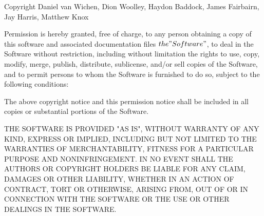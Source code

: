 
Copyright  Daniel van Wichen, Dion Woolley, Haydon Baddock, James Fairbairn, Jay Harris, Matthew Knox

Permission is hereby granted, free of charge, to any person obtaining a copy
of this software and associated documentation files \(the "Software"\), to deal
in the Software without restriction, including without limitation the rights
to use, copy, modify, merge, publish, distribute, sublicense, and/or sell
copies of the Software, and to permit persons to whom the Software is
furnished to do so, subject to the following conditions:

The above copyright notice and this permission notice shall be included in
all copies or substantial portions of the Software.

THE SOFTWARE IS PROVIDED "AS IS", WITHOUT WARRANTY OF ANY KIND, EXPRESS OR
IMPLIED, INCLUDING BUT NOT LIMITED TO THE WARRANTIES OF MERCHANTABILITY,
FITNESS FOR A PARTICULAR PURPOSE AND NONINFRINGEMENT. IN NO EVENT SHALL THE
AUTHORS OR COPYRIGHT HOLDERS BE LIABLE FOR ANY CLAIM, DAMAGES OR OTHER
LIABILITY, WHETHER IN AN ACTION OF CONTRACT, TORT OR OTHERWISE, ARISING FROM,
OUT OF OR IN CONNECTION WITH THE SOFTWARE OR THE USE OR OTHER DEALINGS IN
THE SOFTWARE.

\thispagestyle{empty}